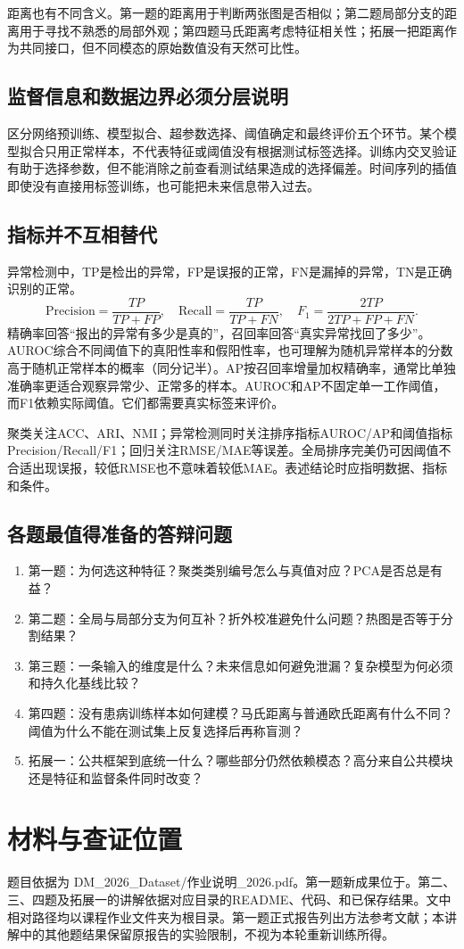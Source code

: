 \documentclass[UTF8,fontset=windows,11pt,a4paper]{ctexart}
\begin{document}
距离也有不同含义。第一题的距离用于判断两张图是否相似；第二题局部分支的距离用于寻找不熟悉的局部外观；第四题马氏距离考虑特征相关性；拓展一把距离作为共同接口，但不同模态的原始数值没有天然可比性。

\subsection{监督信息和数据边界必须分层说明}
区分网络预训练、模型拟合、超参数选择、阈值确定和最终评价五个环节。某个模型拟合只用正常样本，不代表特征或阈值没有根据测试标签选择。训练内交叉验证有助于选择参数，但不能消除之前查看测试结果造成的选择偏差。时间序列的插值即使没有直接用标签训练，也可能把未来信息带入过去。

\subsection{指标并不互相替代}
异常检测中，TP是检出的异常，FP是误报的正常，FN是漏掉的异常，TN是正确识别的正常。
\[
\mathrm{Precision}=\frac{TP}{TP+FP},\quad
\mathrm{Recall}=\frac{TP}{TP+FN},\quad
F_1=\frac{2TP}{2TP+FP+FN}.
\]
精确率回答“报出的异常有多少是真的”，召回率回答“真实异常找回了多少”。AUROC综合不同阈值下的真阳性率和假阳性率，也可理解为随机异常样本的分数高于随机正常样本的概率（同分记半）。AP按召回率增量加权精确率，通常比单独准确率更适合观察异常少、正常多的样本。AUROC和AP不固定单一工作阈值，而F1依赖实际阈值。它们都需要真实标签来评价。

聚类关注ACC、ARI、NMI；异常检测同时关注排序指标AUROC/AP和阈值指标Precision/Recall/F1；回归关注RMSE/MAE等误差。全局排序完美仍可因阈值不合适出现误报，较低RMSE也不意味着较低MAE。表述结论时应指明数据、指标和条件。

\subsection{各题最值得准备的答辩问题}
\begin{enumerate}
\item 第一题：为何选这种特征？聚类类别编号怎么与真值对应？PCA是否总是有益？
\item 第二题：全局与局部分支为何互补？折外校准避免什么问题？热图是否等于分割结果？
\item 第三题：一条输入的维度是什么？未来信息如何避免泄漏？复杂模型为何必须和持久化基线比较？
\item 第四题：没有患病训练样本如何建模？马氏距离与普通欧氏距离有什么不同？阈值为什么不能在测试集上反复选择后再称盲测？
\item 拓展一：公共框架到底统一什么？哪些部分仍然依赖模态？高分来自公共模块还是特征和监督条件同时改变？
\end{enumerate}

\section*{材料与查证位置}
题目依据为 DM\_2026\_Dataset/作业说明\_2026.pdf。第一题新成果位于。第二、三、四题及拓展一的讲解依据对应目录的README、代码、和已保存结果。文中相对路径均以课程作业文件夹为根目录。第一题正式报告列出方法参考文献；本讲解中的其他题结果保留原报告的实验限制，不视为本轮重新训练所得。
\end{document}
